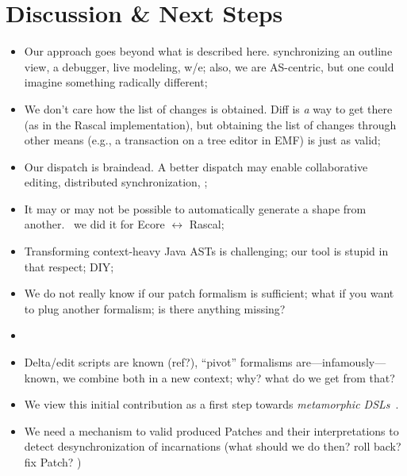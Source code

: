 \section{Discussion \& Next Steps}
\label{sec:discussion}
\begin{itemize}
	\item Our approach goes beyond what is described here. \eg synchronizing an outline view, a debugger, live modeling, w/e; also, we are AS-centric, but one could imagine something radically different;
	\item We don’t care how the list of changes is obtained. Diff is \emph{a} way to get there (as in the Rascal implementation), but obtaining the list of changes through other means (e.g., a transaction on a tree editor in EMF) is just as valid;
	\item Our dispatch is braindead. A better dispatch may enable collaborative editing, distributed synchronization, \etc;
	\item It may or may not be possible to automatically generate a shape from another. \eg~we did it for Ecore $\leftrightarrow$ Rascal;
	\item Transforming context-heavy Java ASTs is challenging; our tool is stupid in that respect; DIY;
	\item We do not really know if our patch formalism is sufficient; what if you want to plug another formalism; is there anything missing?
	\item \cite{lammel2005mappings}
	\item Delta/edit scripts are known (ref?), ``pivot'' formalisms are---infamously---known, we combine both in a new context; why? what do we get from that?
	\item We view this initial contribution as a first step towards \emph{metamorphic DSLs}~\cite{acher2014metamorphic}.
	\item We need a mechanism to valid produced Patches and their interpretations to detect desynchronization of incarnations (what should we do then? roll back? fix Patch? )
\end{itemize}
